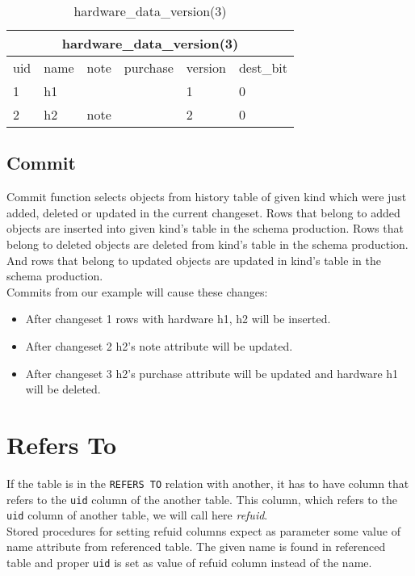 \documentclass[deska]{subfiles}
\begin{document}
\begin{center}

\begin{table}
    \caption{hardware\_data\_version(3)}
    \label{tab-select-hardware-v3}
\begin{tabular}{ | l | l | l | l | l | l |}
    \hline
    \multicolumn{6}{|c|}{hardware\_data\_version(3)}\\
    \hline
    uid & name & note & purchase & version & dest\_bit\\
    \hline
    1 & h1 &  &  & 1 & 0\\
    2 & h2 & note &  & 2 & 0\\
    \hline
\end{tabular}
\end{table}

\end{center}

\subsection{Commit}
Commit function selects objects from history table of given kind which were just added, deleted or updated in the current changeset. Rows that belong to added objects are inserted into given kind's table in the schema production. Rows that belong to deleted objects are deleted from kind's table in the schema production. And rows that belong to updated objects are updated in kind's table in the schema production.\\
Commits from our example will cause these changes:
\begin{itemize}
    \item After changeset 1 rows with hardware h1, h2 will be inserted.
    \item After changeset 2 h2's note attribute will be updated.
    \item After changeset 3 h2's purchase attribute will be updated and hardware h1 will be deleted.
\end{itemize}

\section{Refers To}
\label{sec:db-refs-to}
If the table is in the {\tt REFERS TO} relation with another, it has to have column that refers to the {\tt uid} column of the another table. This column, which refers to the {\tt uid} column of another table, we will call here {\em refuid}.\\
Stored procedures for setting refuid columns expect as parameter some value of name attribute from referenced table. The given name is found in referenced table and proper {\tt uid} is set as value of refuid column instead of the name.
\end{document}
